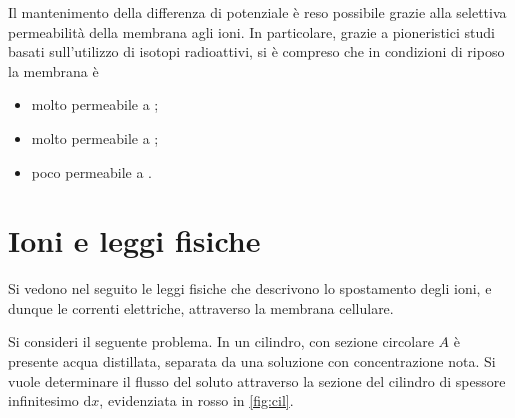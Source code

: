 Il mantenimento della differenza di potenziale è reso possibile grazie alla selettiva permeabilità della membrana agli ioni. In particolare, grazie a pioneristici studi basati sull'utilizzo di isotopi radioattivi, si è compreso che in condizioni di riposo la membrana è
\begin{itemize}
    \item molto permeabile a ;
    \item molto permeabile a ;
    \item poco permeabile a .
\end{itemize}

\section{Ioni e leggi fisiche}
Si vedono nel seguito le leggi fisiche che descrivono lo spostamento degli ioni, e dunque le correnti elettriche, attraverso la membrana cellulare.

Si consideri il seguente problema. In un cilindro, con sezione circolare $A$ è presente acqua distillata, separata da una soluzione con concentrazione nota. Si vuole determinare il flusso del soluto attraverso la sezione del cilindro di spessore infinitesimo $\mathrm{d}x$, evidenziata in rosso in \autoref{fig:cil}.


